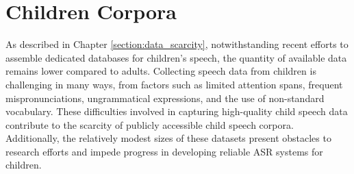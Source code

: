 \section{Children Corpora}
\label{section:children_corpora}
As described in Chapter \ref{section:data_scarcity}, notwithstanding recent efforts to assemble dedicated databases for children's speech, the quantity of available data remains lower compared to adults. Collecting speech data from children is challenging in many ways, from factors such as limited attention spans, frequent mispronunciations, ungrammatical expressions, and the use of non-standard vocabulary. These difficulties involved in capturing high-quality child speech data contribute to the scarcity of publicly accessible child speech corpora. Additionally, the relatively modest sizes of these datasets present obstacles to research efforts and impede progress in developing reliable \ac{ASR} systems for children.



